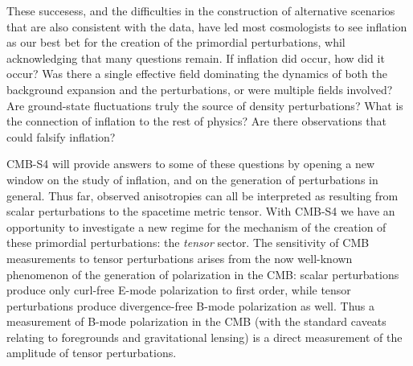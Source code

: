 
These succesess, and the difficulties in the construction of alternative
scenarios that are also consistent with the data, have led most cosmologists to
see inflation as our best bet for the creation of the primordial perturbations,
whil acknowledging that many questions remain. If inflation did occur, how did
it occur? Was there a single effective field dominating the dynamics of both
the background expansion and the perturbations, or were multiple fields
involved? Are ground-state fluctuations truly the source of density
perturbations? What is the connection of inflation to the rest of physics?
Are there observations that could falsify inflation?

CMB-S4 will provide answers to some of these questions by opening a new window on the study of inflation, and on the generation of perturbations in general. Thus far, observed anisotropies can all be interpreted as resulting from scalar perturbations to the spacetime metric tensor.  With CMB-S4 we have an opportunity to investigate a new regime for the mechanism of the creation of these primordial perturbations: the {\em tensor} sector. The sensitivity of CMB measurements to tensor perturbations arises from the now well-known phenomenon of the generation of polarization in the CMB: scalar perturbations produce only curl-free E-mode polarization to first order, while tensor perturbations produce divergence-free B-mode polarization as well. Thus a measurement of B-mode polarization in the CMB (with the standard caveats relating to foregrounds and gravitational lensing) is a direct measurement of the amplitude of tensor perturbations.

